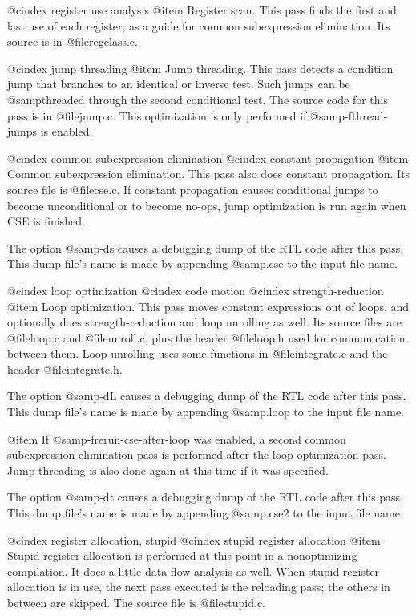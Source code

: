 @cindex register use analysis
@item
Register scan.  This pass finds the first and last use of each
register, as a guide for common subexpression elimination.  Its source
is in @file{regclass.c}.

@cindex jump threading
@item
Jump threading.  This pass detects a condition jump that branches to an
identical or inverse test.  Such jumps can be @samp{threaded} through
the second conditional test.  The source code for this pass is in
@file{jump.c}.  This optimization is only performed if
@samp{-fthread-jumps} is enabled.

@cindex common subexpression elimination
@cindex constant propagation
@item
Common subexpression elimination.  This pass also does constant
propagation.  Its source file is @file{cse.c}.  If constant
propagation causes conditional jumps to become unconditional or to
become no-ops, jump optimization is run again when CSE is finished.

The option @samp{-ds} causes a debugging dump of the RTL code after
this pass.  This dump file's name is made by appending @samp{.cse} to
the input file name.

@cindex loop optimization
@cindex code motion
@cindex strength-reduction
@item
Loop optimization.  This pass moves constant expressions out of loops,
and optionally does strength-reduction and loop unrolling as well.
Its source files are @file{loop.c} and @file{unroll.c}, plus the header
@file{loop.h} used for communication between them.  Loop unrolling uses
some functions in @file{integrate.c} and the header @file{integrate.h}.

The option @samp{-dL} causes a debugging dump of the RTL code after
this pass.  This dump file's name is made by appending @samp{.loop} to
the input file name.

@item
If @samp{-frerun-cse-after-loop} was enabled, a second common
subexpression elimination pass is performed after the loop optimization
pass.  Jump threading is also done again at this time if it was specified.

The option @samp{-dt} causes a debugging dump of the RTL code after
this pass.  This dump file's name is made by appending @samp{.cse2} to
the input file name.

@cindex register allocation, stupid
@cindex stupid register allocation
@item
Stupid register allocation is performed at this point in a
nonoptimizing compilation.  It does a little data flow analysis as
well.  When stupid register allocation is in use, the next pass
executed is the reloading pass; the others in between are skipped.
The source file is @file{stupid.c}.

